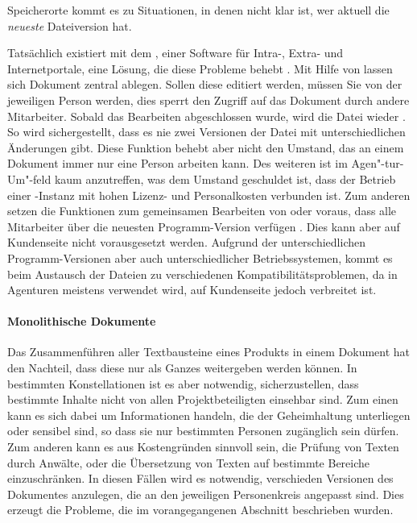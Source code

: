 Speicherorte kommt es zu Situationen, in denen nicht klar ist, wer aktuell die \emph{neueste} Dateiversion hat. 

Tatsächlich existiert mit dem  , einer Software für Intra-, Extra- und Internetportale, eine Lösung, die diese Probleme behebt \cite{sharepoint-shared-documents}. Mit Hilfe von  lassen sich Dokument zentral ablegen. Sollen diese editiert werden, müssen Sie von der jeweiligen Person  werden, dies sperrt den Zugriff auf das Dokument durch andere Mitarbeiter. Sobald das Bearbeiten abgeschlossen wurde, wird die Datei wieder . So wird sichergestellt, dass es nie zwei Versionen der Datei mit unterschiedlichen Änderungen gibt. Diese Funktion behebt aber nicht den Umstand, das an einem Dokument immer nur eine Person arbeiten kann. Des weiteren ist  im Agen"-tur-Um"-feld kaum anzutreffen, was dem Umstand geschuldet ist, dass der Betrieb einer -Instanz mit hohen Lizenz- und Personalkosten verbunden ist. Zum anderen setzen die Funktionen zum gemeinsamen Bearbeiten von  oder  voraus, dass alle Mitarbeiter über die neuesten Programm-Version verfügen \cite{sharepoint-wordversions}. Dies kann aber auf Kundenseite nicht vorausgesetzt werden. Aufgrund der unterschiedlichen Programm-Versionen aber auch unterschiedlicher Betriebssystemen, kommt es beim Austausch der Dateien zu verschiedenen Kompatibilitätsproblemen, da in Agenturen meistens  verwendet wird, auf Kundenseite jedoch  verbreitet ist.

\paragraph{Monolithische Dokumente} Das Zusammenführen aller Textbausteine eines Produkts in einem Dokument hat den Nachteil, dass diese nur als Ganzes weitergeben werden können. In bestimmten Konstellationen ist es aber notwendig, sicherzustellen, dass bestimmte Inhalte nicht von allen Projektbeteiligten einsehbar sind. Zum einen kann es sich dabei um Informationen handeln, die der Geheimhaltung unterliegen oder sensibel sind, so dass sie nur bestimmten Personen zugänglich sein dürfen. Zum anderen kann es aus Kostengründen sinnvoll sein, die Prüfung von Texten durch Anwälte, oder die Übersetzung von Texten auf bestimmte Bereiche einzuschränken. In diesen Fällen wird es notwendig, verschieden Versionen des Dokumentes anzulegen, die an den jeweiligen Personenkreis angepasst sind. Dies erzeugt die Probleme, die im vorangegangenen Abschnitt beschrieben wurden.


